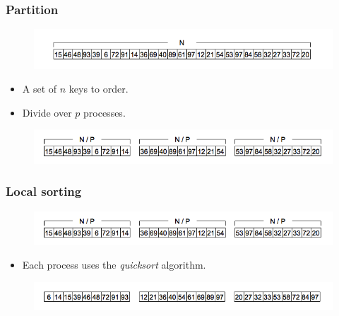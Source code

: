 \documentclass{beamer}
\begin{document}
\begin{frame}
	\frametitle{Partition}
	\begin{figure}
		\begin{center}
			\includegraphics[width=\textwidth]{images/00start.png}
		\end{center}
	\end{figure}
	
	\begin{itemize}
		\item{A set of $n$ keys to order.}
		\pause
		\item{Divide over $p$ processes.}
	\end{itemize}
	
	\begin{figure}
		\begin{center}
			\includegraphics[width=\textwidth]{images/01partition.png}
		\end{center}
	\end{figure}
\end{frame}










\begin{frame}
	\frametitle{Local sorting}
	\begin{figure}
		\begin{center}
			\includegraphics[width=\textwidth]{images/01partition.png}
		\end{center}
	\end{figure}
	
	\pause
	\begin{itemize}
		\item{Each process uses the \textit{quicksort} algorithm.}
	\end{itemize}
	
	\begin{figure}
		\begin{center}
			\includegraphics[width=\textwidth]{images/02localorder.png}
		\end{center}
	\end{figure}
\end{frame}
\end{document}
